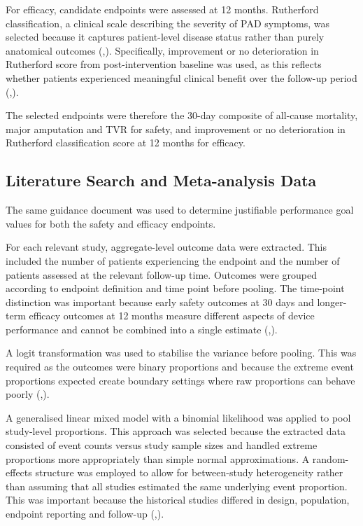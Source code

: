 \documentclass{article}
\begin{document}
For efficacy, candidate endpoints were assessed at 12 months. Rutherford
classification, a clinical scale describing the severity of PAD
symptoms, was selected because it captures patient-level disease status
rather than purely anatomical outcomes
(,).
Specifically, improvement or no deterioration in Rutherford score from
post-intervention baseline was used, as this reflects whether patients
experienced meaningful clinical benefit over the follow-up period
(,).

The selected endpoints were therefore the 30-day composite of all-cause
mortality, major amputation and TVR for safety, and improvement or no
deterioration in Rutherford classification score at 12 months for
efficacy.

\subsection{Literature Search and Meta-analysis
Data}\label{literature-search-and-meta-analysis-data}

The same guidance document was used to determine justifiable performance
goal values for both the safety and efficacy endpoints.

For each relevant study, aggregate-level outcome data were extracted.
This included the number of patients experiencing the endpoint and the
number of patients assessed at the relevant follow-up time. Outcomes
were grouped according to endpoint definition and time point before
pooling. The time-point distinction was important because early safety
outcomes at 30 days and longer-term efficacy outcomes at 12 months
measure different aspects of device performance and cannot be combined
into a single estimate
(,).

A logit transformation was used to stabilise the variance before
pooling. This was required as the outcomes were binary proportions and
because the extreme event proportions expected create boundary settings
where raw proportions can behave poorly
(,).

A generalised linear mixed model with a binomial likelihood was applied
to pool study-level proportions. This approach was selected because the
extracted data consisted of event counts versus study sample sizes and
handled extreme proportions more appropriately than simple normal
approximations. A random-effects structure was employed to allow for
between-study heterogeneity rather than assuming that all studies
estimated the same underlying event proportion. This was important
because the historical studies differed in design, population, endpoint
reporting and follow-up
(,).
\end{document}

